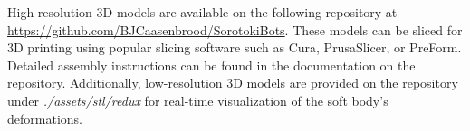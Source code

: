 \begin{rmk}
\normalfont
High-resolution 3D models are available on the following repository at \url{https://github.com/BJCaasenbrood/SorotokiBots}. These models can be sliced for 3D printing using popular slicing software such as Cura, PrusaSlicer, or PreForm. Detailed assembly instructions can be found in the documentation on the repository. Additionally, low-resolution 3D models are provided on the repository under \textit{./assets/stl/redux} for real-time visualization of the soft body's deformations.
\end{rmk}

\vfill